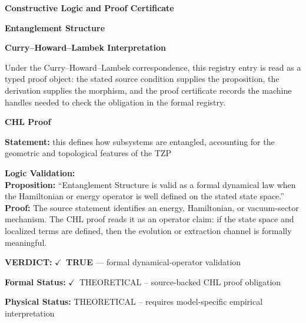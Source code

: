 \clearpage
\begingroup\tzpsupportsetup
\noindent\textbf{\fontsize{10.8pt}{12.8pt}\selectfont [ID 0065] Constructive Logic and Proof Certificate}\par
\noindent\textbf{\fontsize{10pt}{12pt}\selectfont Entanglement Structure}\par
\vspace{0.45em}
\begingroup
\footnotesize
\setlength{\parskip}{0.22em}
\setlength{\parindent}{0pt}
\noindent\textbf{Curry--Howard--Lambek Interpretation}\par
Under the Curry--Howard--Lambek correspondence, this registry entry is read as a typed proof
object: the stated source condition supplies the proposition, the derivation supplies the
morphism, and the proof certificate records the machine handles needed to check the obligation
in the formal registry.

\vspace{0.45em}
\noindent\textbf{CHL Proof}\par
\textbf{Statement:} this defines how subsystems are entangled, accounting for the geometric and topological
features of the TZP

\textbf{Logic Validation:}\\
\textbf{Proposition:} ``Entanglement Structure is valid as a formal dynamical law when the Hamiltonian or energy
operator is well defined on the stated state space.''\\
\textbf{Proof:} The source statement identifies an energy, Hamiltonian, or vacuum-sector mechanism. The
CHL proof reads it as an operator claim: if the state space and localized terms are
defined, then the evolution or extraction channel is formally meaningful.

\textbf{VERDICT:} \ensuremath{\checkmark}\ \textbf{TRUE} --- formal dynamical-operator validation

\textbf{Formal Status:} \ensuremath{\checkmark}\ THEORETICAL -- source-backed CHL proof obligation

\textbf{Physical Status:} THEORETICAL -- requires model-specific empirical interpretation
\par\vspace{0.45em}
\par
\ifTZPDarkEdition
{}
\fi
\endgroup
\endgroup
